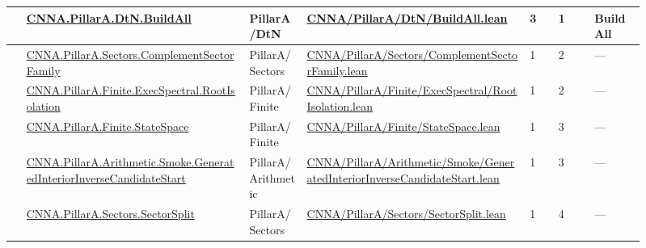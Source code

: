 \begin{longtable}{L{0.025\linewidth} L{0.315\linewidth} L{0.08\linewidth} L{0.315\linewidth} L{0.045\linewidth} L{0.055\linewidth} L{0.07\linewidth}}
\hline
{} & \href{run:repo_snapshot/CNNA/PillarA/DtN/BuildAll.lean}{CNNA.\allowbreak{}PillarA.\allowbreak{}DtN.\allowbreak{}BuildAll} & PillarA/\allowbreak{}DtN & \href{run:repo_snapshot/CNNA/PillarA/DtN/BuildAll.lean}{CNNA/\allowbreak{}PillarA/\allowbreak{}DtN/\allowbreak{}BuildAll.\allowbreak{}lean} & 3 & 1 & BuildAll\\
\hline
{} & \href{run:repo_snapshot/CNNA/PillarA/Sectors/ComplementSectorFamily.lean}{CNNA.\allowbreak{}PillarA.\allowbreak{}Sectors.\allowbreak{}ComplementSectorFamily} & PillarA/\allowbreak{}Sectors & \href{run:repo_snapshot/CNNA/PillarA/Sectors/ComplementSectorFamily.lean}{CNNA/\allowbreak{}PillarA/\allowbreak{}Sectors/\allowbreak{}ComplementSectorFamily.\allowbreak{}lean} & 1 & 2 & ---\\
\hline
{} & \href{run:repo_snapshot/CNNA/PillarA/Finite/ExecSpectral/RootIsolation.lean}{CNNA.\allowbreak{}PillarA.\allowbreak{}Finite.\allowbreak{}ExecSpectral.\allowbreak{}RootIsolation} & PillarA/\allowbreak{}Finite & \href{run:repo_snapshot/CNNA/PillarA/Finite/ExecSpectral/RootIsolation.lean}{CNNA/\allowbreak{}PillarA/\allowbreak{}Finite/\allowbreak{}ExecSpectral/\allowbreak{}RootIsolation.\allowbreak{}lean} & 1 & 2 & ---\\
\hline
{} & \href{run:repo_snapshot/CNNA/PillarA/Finite/StateSpace.lean}{CNNA.\allowbreak{}PillarA.\allowbreak{}Finite.\allowbreak{}StateSpace} & PillarA/\allowbreak{}Finite & \href{run:repo_snapshot/CNNA/PillarA/Finite/StateSpace.lean}{CNNA/\allowbreak{}PillarA/\allowbreak{}Finite/\allowbreak{}StateSpace.\allowbreak{}lean} & 1 & 3 & ---\\
\hline
{} & \href{run:repo_snapshot/CNNA/PillarA/Arithmetic/Smoke/GeneratedInteriorInverseCandidateStart.lean}{CNNA.\allowbreak{}PillarA.\allowbreak{}Arithmetic.\allowbreak{}Smoke.\allowbreak{}GeneratedInteriorInverseCandidateStart} & PillarA/\allowbreak{}Arithmetic & \href{run:repo_snapshot/CNNA/PillarA/Arithmetic/Smoke/GeneratedInteriorInverseCandidateStart.lean}{CNNA/\allowbreak{}PillarA/\allowbreak{}Arithmetic/\allowbreak{}Smoke/\allowbreak{}GeneratedInteriorInverseCandidateStart.\allowbreak{}lean} & 1 & 3 & ---\\
\hline
{} & \href{run:repo_snapshot/CNNA/PillarA/Sectors/SectorSplit.lean}{CNNA.\allowbreak{}PillarA.\allowbreak{}Sectors.\allowbreak{}SectorSplit} & PillarA/\allowbreak{}Sectors & \href{run:repo_snapshot/CNNA/PillarA/Sectors/SectorSplit.lean}{CNNA/\allowbreak{}PillarA/\allowbreak{}Sectors/\allowbreak{}SectorSplit.\allowbreak{}lean} & 1 & 4 & ---\\

\end{longtable}
